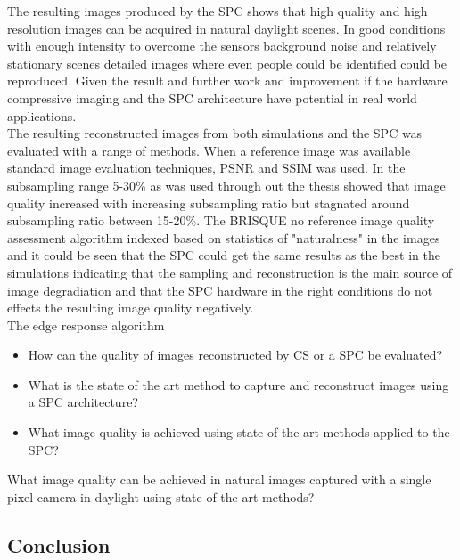 The resulting images produced by the SPC shows that high quality and high resolution images can be acquired in natural daylight scenes. In good conditions with enough intensity to overcome the sensors background noise and relatively stationary scenes detailed images where even people could be identified could be reproduced. Given the result and further work and improvement if the hardware compressive imaging and the SPC architecture have potential in real world applications.\\[0.1in]

The resulting reconstructed images from both simulations and the SPC was evaluated with a range of methods. When a reference image was available standard image evaluation techniques, PSNR and SSIM was used. In the subsampling range 5-30\% as was used through out the thesis showed that image quality increased with increasing subsampling ratio but stagnated around subsampling ratio between 15-20\%. The BRISQUE no reference image quality assessment algorithm indexed based on statistics of "naturalness" in the images and it could be seen that the SPC could get the same results as the best in the simulations indicating that the sampling and reconstruction is the main source of image degradiation and that the SPC hardware in the right conditions do not effects the resulting image quality negatively.\\[0.1in] 

The edge response algorithm 




   

\begin{itemize}
    \item How can the quality of images reconstructed by CS or a SPC be evaluated?
    \item What is the state of the art method to capture and reconstruct images using a SPC architecture?
    \item What image quality is achieved using state of the art methods applied to the SPC?
\end{itemize}

What image quality can be achieved in natural images captured with a single pixel camera in daylight using state of the art methods? 

\subsection{Conclusion}





